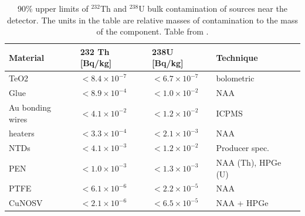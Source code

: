 \begin{table}[htbp]
\centering
\caption[90\% C.L. upper limits of $^{232}$Th and $^{238}$U bulk contamination of sources near the detector.]
{90\% upper limits of $^{232}$Th and $^{238}$U bulk contamination of sources near the detector.
The units in the table are relative masses of contamination to the mass of the component.
Table from \cite{Alduino:2017qet}.}
\label{tab:NearDetectorSources_Bulk}
\begin{tabular}{llll}
\hline
\hline
Material         & 232 Th [Bq/kg]         & 238U [Bq/kg]           & Technique           \\
\hline
TeO2             & $<8.4\times10^{-7}$ & $<6.7\times10^{-7}$ & bolometric          \\
Glue             & $<8.9\times10^{-4}$ & $<1.0\times10^{-2}$ & NAA                 \\
Au bonding wires & $<4.1\times10^{-2}$ & $<1.2\times10^{-2}$ & ICPMS               \\
heaters          & $<3.3\times10^{-4}$ & $<2.1\times10^{-3}$ & NAA                 \\
NTDs             & $<4.1\times10^{-3}$ & $<1.2\times10^{-2}$ & Producer spec.      \\
PEN              & $<1.0\times10^{-3}$ & $<1.3\times10^{-3}$ & NAA (Th), HPGe (U) \\
PTFE             & $<6.1\times10^{-6}$ & $<2.2\times10^{-5}$ & NAA                 \\
CuNOSV           & $<2.1\times10^{-6}$ & $<6.5\times10^{-5}$ & NAA + HPGe         \\
\hline
\hline
\end{tabular}
\end{table}

